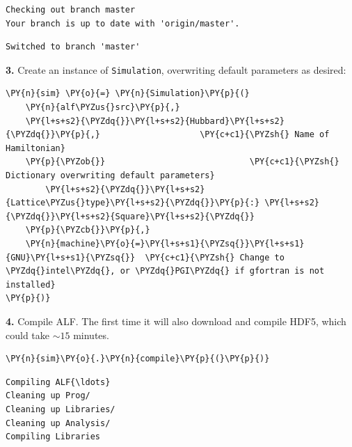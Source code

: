     \begin{Verbatim}[commandchars=\\\{\}]
Checking out branch master
Your branch is up to date with 'origin/master'.
    \end{Verbatim}

    \begin{Verbatim}[commandchars=\\\{\}]
Switched to branch 'master'
    \end{Verbatim}

    \textbf{3.} Create an instance of \texttt{Simulation}, overwriting
default parameters as desired:

    \begin{tcolorbox}[breakable, size=fbox, boxrule=1pt, pad at break*=1mm,colback=cellbackground, colframe=cellborder]
\begin{Verbatim}[commandchars=\\\{\}]
\PY{n}{sim} \PY{o}{=} \PY{n}{Simulation}\PY{p}{(}
    \PY{n}{alf\PYZus{}src}\PY{p}{,}
    \PY{l+s+s2}{\PYZdq{}}\PY{l+s+s2}{Hubbard}\PY{l+s+s2}{\PYZdq{}}\PY{p}{,}                    \PY{c+c1}{\PYZsh{} Name of Hamiltonian}
    \PY{p}{\PYZob{}}                             \PY{c+c1}{\PYZsh{} Dictionary overwriting default parameters}
        \PY{l+s+s2}{\PYZdq{}}\PY{l+s+s2}{Lattice\PYZus{}type}\PY{l+s+s2}{\PYZdq{}}\PY{p}{:} \PY{l+s+s2}{\PYZdq{}}\PY{l+s+s2}{Square}\PY{l+s+s2}{\PYZdq{}}
    \PY{p}{\PYZcb{}}\PY{p}{,}
    \PY{n}{machine}\PY{o}{=}\PY{l+s+s1}{\PYZsq{}}\PY{l+s+s1}{GNU}\PY{l+s+s1}{\PYZsq{}}  \PY{c+c1}{\PYZsh{} Change to \PYZdq{}intel\PYZdq{}, or \PYZdq{}PGI\PYZdq{} if gfortran is not installed}
\PY{p}{)}
\end{Verbatim}
\end{tcolorbox}

    \textbf{4.} Compile ALF. The first time it will also download and
compile HDF5, which could take \(\sim15\) minutes.

    \begin{tcolorbox}[breakable, size=fbox, boxrule=1pt, pad at break*=1mm,colback=cellbackground, colframe=cellborder]
\begin{Verbatim}[commandchars=\\\{\}]
\PY{n}{sim}\PY{o}{.}\PY{n}{compile}\PY{p}{(}\PY{p}{)}
\end{Verbatim}
\end{tcolorbox}

    \begin{Verbatim}[commandchars=\\\{\}]
Compiling ALF{\ldots}
Cleaning up Prog/
Cleaning up Libraries/
Cleaning up Analysis/
Compiling Libraries
    \end{Verbatim}

